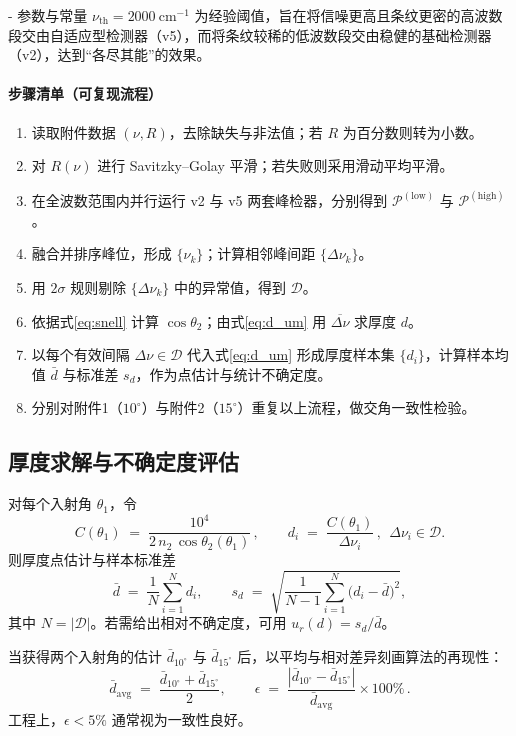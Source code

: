 \documentclass{ctexart} %
\begin{document}
- 参数与常量
\(\nu_{\mathrm{th}}=2000~\mathrm{cm}^{-1}\) 为经验阈值，旨在将信噪更高且条纹更密的高波数段交由自适应型检测器（v5），而将条纹较稀的低波数段交由稳健的基础检测器（v2），达到“各尽其能”的效果。

\paragraph{步骤清单（可复现流程）}
\begin{enumerate}
    \item 读取附件数据 \((\nu, R)\)，去除缺失与非法值；若 \(R\) 为百分数则转为小数。
    \item 对 \(R(\nu)\) 进行 Savitzky–Golay 平滑；若失败则采用滑动平均平滑。
    \item 在全波数范围内并行运行 v2 与 v5 两套峰检器，分别得到 \(\mathcal{P}^{(\mathrm{low})}\) 与 \(\mathcal{P}^{(\mathrm{high})}\)。
    \item 融合并排序峰位，形成 \(\{\nu_k\}\)；计算相邻峰间距 \(\{\Delta\nu_k\}\)。
    \item 用 \(2\sigma\) 规则剔除 \(\{\Delta\nu_k\}\) 中的异常值，得到 \(\mathcal{D}\)。
    \item 依据式\eqref{eq:snell} 计算 \(\cos\theta_2\)；由式\eqref{eq:d_um} 用 \(\overline{\Delta\nu}\) 求厚度 \(d\)。
    \item 以每个有效间隔 \(\Delta\nu\in\mathcal{D}\) 代入式\eqref{eq:d_um} 形成厚度样本集 \(\{d_i\}\)，计算样本均值 \(\bar d\) 与标准差 \(s_d\)，作为点估计与统计不确定度。
    \item 分别对附件1（\(10^\circ\)）与附件2（\(15^\circ\)）重复以上流程，做交角一致性检验。
\end{enumerate}

\subsection{厚度求解与不确定度评估}
对每个入射角 \(\theta_1\)，令
\[
    C(\theta_1) \;=\; \frac{10^{4}}{2\,n_2\,\cos\theta_2(\theta_1)}\,,
    \qquad
    d_i \;=\; \frac{C(\theta_1)}{\Delta\nu_i}\,,\ \ \Delta\nu_i\in\mathcal{D}.
\]
则厚度点估计与样本标准差
\begin{equation}
    \bar d \;=\; \frac{1}{N}\sum_{i=1}^N d_i,\qquad
    s_d \;=\; \sqrt{\frac{1}{N-1}\sum_{i=1}^N\big(d_i-\bar d\big)^2},
    \label{eq:dest}
\end{equation}
其中 \(N=|\mathcal{D}|\)。若需给出相对不确定度，可用 \(u_r(d)=s_d/\bar d\)。

当获得两个入射角的估计 \(\bar d_{10^\circ}\) 与 \(\bar d_{15^\circ}\) 后，以平均与相对差异刻画算法的再现性：
\begin{equation}
    \bar d_{\mathrm{avg}} \;=\; \frac{\bar d_{10^\circ}+\bar d_{15^\circ}}{2},\qquad
    \epsilon \;=\; \frac{\left|\bar d_{10^\circ}-\bar d_{15^\circ}\right|}{\bar d_{\mathrm{avg}}}\times 100\%\,.
    \label{eq:consistency}
\end{equation}
工程上，\(\epsilon<5\%\) 通常视为一致性良好。
\end{document}
